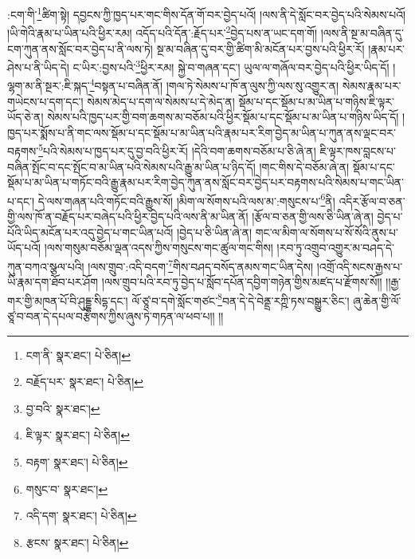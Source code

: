 :ངག་གི་\footnote{ངག་ནི་  སྣར་ཐང་།  པེ་ཅིན། }ཚིག་སྟེ། དབྱངས་ཀྱི་ཁྱད་པར་གང་གིས་དོན་གོ་བར་བྱེད་པའོ། །ལས་ནི་དེ་སློང་བར་བྱེད་པའི་སེམས་པའོ། །ཡི་གེའི་རྣམ་པ་ཡིན་པའི་ཕྱིར་རམ། འདོད་པའི་དོན་:རྗོད་པར་\footnote{བརྗོད་པར་  སྣར་ཐང་།  པེ་ཅིན། }བྱེད་པས་ན་ཡང་དག་གོ། །ལས་ནི་སྔ་མ་བཞིན་དུ་ངག་ཀུན་ནས་སློང་བར་བྱེད་པ་ནི་ལས་ཏེ། སྔ་མ་བཞིན་དུ་བར་གྱི་ཚིག་མི་མངོན་པར་བྱས་པའི་ཕྱིར་རོ། །རྣམ་པར་ཤེས་པ་ནི་ཡིད་དེ། ང་ཡིར་:བྱས་པའི་\footnote{བྱ་བའི་  སྣར་ཐང་། }ཕྱིར་རམ། སྐྱེ་བ་གཞན་དང་། ཡུལ་ལ་གཞོལ་བར་བྱེད་པའི་ཕྱིར་ཡིད་དོ། །ལྷག་མ་ནི་སྔར་:ཇི་སྐད་\footnote{ཇི་ལྟར་  སྣར་ཐང་།  པེ་ཅིན། }བསྟན་པ་བཞིན་ནོ། །གལ་ཏེ་སེམས་པ་ཁོ་ན་ལུས་ཀྱི་ལས་སུ་འགྱུར་ན། སེམས་རྣམ་པར་གཡེངས་པ་དག་དང་། སེམས་མེད་པ་དག་ལ་སེམས་པ་དེ་མེད་ན། སྡོམ་པ་དང་སྡོམ་པ་མ་ཡིན་པ་གཉིས་ཇི་ལྟར་ཡོད་ཅེ་ན། སེམས་པའི་ཁྱད་པར་གྱི་བག་ཆགས་མ་བཅོམ་པའི་ཕྱིར་སྡོམ་པ་དང་སྡོམ་པ་མ་ཡིན་པ་གཉིས་ཡིད་དོ། །ཁྱད་པར་སྨོས་པ་ནི་གང་ལས་སྡོམ་པ་དང་སྡོམ་པ་མ་ཡིན་པའི་རྣམ་པར་རིག་བྱེད་མ་ཡིན་པ་ཀུན་ནས་ལྡང་བར་བརྟགས་\footnote{བརྟག་  སྣར་ཐང་།  པེ་ཅིན། }པའི་སེམས་པ་ཁྱད་པར་དུ་བྱ་བའི་ཕྱིར་རོ། །དེའི་བག་ཆགས་བཅོམ་པ་ཅི་ཞེ་ན། ཇི་ལྟར་ཁས་བླངས་པ་བཞིན་སྤོང་བ་དང་སྤོང་བ་མ་ཡིན་པའི་སེམས་པའི་རྒྱུ་མ་ཡིན་པ་ཉིད་དོ། །གང་གིས་དེ་བཅོམ་ཞེ་ན། སྡོམ་པ་དང་སྡོམ་པ་མ་ཡིན་པ་གཏོང་བའི་རྒྱུ་རྣམ་པར་རིག་བྱེད་ཀུན་ནས་སློང་བར་བྱེད་པར་བརྟགས་པའི་སེམས་པ་གང་ཡིན་པ་དང་། དེ་ལས་གཞན་པའི་གཏོང་བའི་རྒྱུས་སོ། །མིག་ལ་སོགས་པའི་ལས་མ་:གསུངས་པ་\footnote{གསུང་བ་  སྣར་ཐང་། }ནི། འདིར་རྩོལ་བ་ཅན་གྱི་ལས་ཁོ་ན་བརྗོད་པར་བཞེད་པའི་ཕྱིར་བྱེད་པའི་ལས་ནི་མ་ཡིན་ནོ། །རྩོལ་བ་ཅན་གྱི་ལས་ཅི་ཡིན་ཞེ་ན། བྱེད་པ་པོའི་ཡིད་མངོན་པར་འདུ་བྱེད་པ་གང་ཡིན་པའོ། །བྱེད་པ་ཅི་ཡིན་ཞེ་ན། གང་ལ་མིག་ལ་སོགས་པ་སོ་སོའི་ནུས་པ་ཡོད་པའོ། །ལས་གསུམ་བཅོམ་ལྡན་འདས་ཀྱིས་གསུངས་གང་ཚུལ་གང་གིས། །རབ་ཏུ་འགྲུབ་འགྱུར་མ་བཤད་དེ་ཀུན་བཀའ་སྩལ་པའི། །ལས་གྲུབ་:འདི་བདག་\footnote{འདི་དག་  སྣར་ཐང་།  པེ་ཅིན། }གིས་བཤད་བསོད་ནམས་གང་ཡིན་དེས། །འགྲོ་འདི་སངས་རྒྱས་པ་ཡི་རྣམ་དག་ཐོབ་པར་ཤོག །ལས་གྲུབ་པའི་རབ་ཏུ་བྱེད་པ་སློབ་དཔོན་དབྱིག་གཉེན་གྱིས་མཛད་པ་རྫོགས་སོ།། །།རྒྱ་གར་གྱི་མཁན་པོ་བི་ཤུདྡྷ་སིདྷ་དང་། ལོ་ཙཱ་བ་དགེ་སློང་གཙང་\footnote{རྩངས་  སྣར་ཐང་།  པེ་ཅིན། }བན་དེ་དེ་བེནྡྲ་རཀྵི་ཏས་བསྒྱུར་ཅིང་། ཞུ་ཆེན་གྱི་ལོ་ཙཱ་བ་བན་དེ་དཔལ་བརྩེགས་ཀྱིས་ཞུས་ཏེ་གཏན་ལ་ཕབ་པ།། །།
